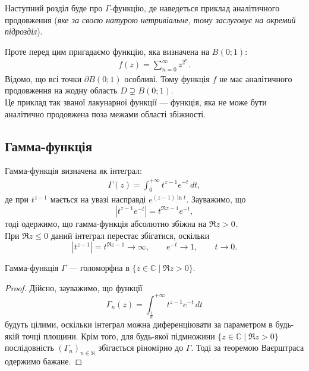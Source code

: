 \documentclass{math_library}
\begin{document}
Наступний розділ буде про $\Gamma$-функцію, де наведеться приклад аналітичного продовження (\textit{яке за своєю натурою нетривіальне, тому заслуговує на окремий підрозділ}).

\begin{example}
Проте перед цим пригадаємо функцію, яка визначена на $B(0;1)$:
\begin{align*}
f(z) = \displaystyle\sum_{n=0}^\infty z^{2^n}.
\end{align*}
Відомо, що всі точки $\partial B(0;1)$ особливі. Тому функція $f$ не має аналітичного продовження на жодну область $D \supsetneq B(0;1)$.
\bigskip \\
Це приклад так званої лакунарної функції --- функція, яка не може бути аналітично продовжена поза межами області збіжності.
\end{example}

\subsection{Гамма-функція}
Гамма-функція визначена як інтеграл:
\begin{align*}
\Gamma(z) = \int_0^{+\infty} t^{z-1} e^{-t}\,dt,
\end{align*}
де при $t^{z-1}$ мається на увазі насправді $e^{(z-1) \ln t}$. Зауважимо, що
\[
|t^{z-1} e^{-t}| = t^{\Re z-1} e^{-t},
\]
тоді одержимо, що гамма-функція абсолютно збіжна на $\Re z > 0$.
\bigskip \\
При $\Re z \leq 0$ даний інтеграл перестає збігатися, оскільки
\[
|t^{z-1}| = t^{\Re z - 1} \to \infty, \qquad e^{-t} \to 1, \qquad t \to 0.
\]

\begin{proposition}
Гамма-функція $\Gamma$ --- голоморфна в $\{ z \in \mathbb{C} \mid \Re z > 0 \}$.
\end{proposition}

\begin{proof}
Дійсно, зауважимо, що функції
\[
\Gamma_n(z) = \int_{\frac{1}{n}}^{+\infty} t^{z-1} e^{-t}\,dt
\]
будуть цілими, оскільки інтеграл можна диференціювати за параметром в будь-якій точці площини. Крім того, для будь-якої підмножини $\{z \in \mathbb{C} \mid \Re z > 0\}$ послідовність $(\Gamma_n)_{n \in \mathbb{N}}$ збігається ріномірно до $\Gamma$. Тоді за теоремою Ваєрштраса одержимо бажане.
\end{proof}
\end{document}
